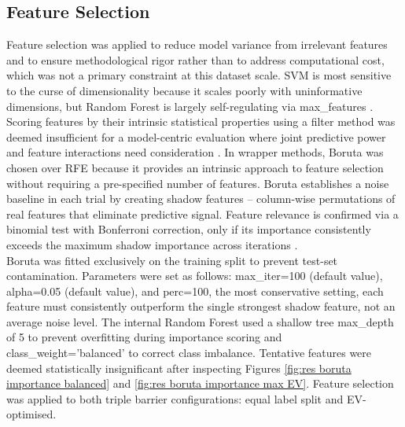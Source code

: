 \subsection{Feature Selection}
Feature selection was applied to reduce model variance from irrelevant features and to ensure methodological rigor rather than to address computational cost, which was not a primary constraint at this dataset scale. SVM is most sensitive to the curse of dimensionality \cite{omoleUsingMachineDeep2025} because it scales poorly with uninformative dimensions, but Random Forest is largely self-regulating via max\_features \cite{RandomForestClassifier}.\\
Scoring features by their intrinsic statistical properties using a filter method was deemed insufficient for a model-centric evaluation where joint predictive power and feature interactions need consideration \cite{omoleUsingMachineDeep2025}. In wrapper methods, Boruta was chosen over RFE because it provides an intrinsic approach to feature selection without requiring a pre-specified number of features. Boruta establishes a noise baseline in each trial by creating shadow features – column-wise permutations of real features that eliminate predictive signal. Feature relevance is confirmed via a binomial test with Bonferroni correction, only if its importance consistently exceeds the maximum shadow importance across iterations \cite{kursaFeatureSelectionBoruta2010}.\\
Boruta was fitted exclusively on the training split to prevent test-set contamination. Parameters were set as follows: max\_iter=100 (default value), alpha=0.05 (default value), and perc=100, the most conservative setting, each feature must consistently outperform the single strongest shadow feature, not an average noise level. The internal Random Forest used a shallow tree max\_depth of 5 to prevent overfitting during importance scoring and class\_weight='balanced' to correct class imbalance. Tentative features were deemed statistically insignificant after inspecting Figures \ref{fig:res boruta importance balanced} and \ref{fig:res boruta importance max EV}. Feature selection was applied to both triple barrier configurations: equal label split and EV-optimised.
